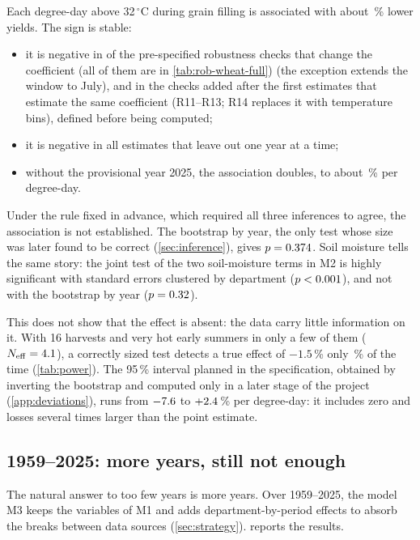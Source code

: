 Each degree-day above 32\,$^{\circ}$C during grain filling is associated with about \WheatPct\,\% lower yields. The sign is stable:
\begin{itemize}
  \item it is negative in \WheatRobPreNeg{} of the \WheatRobPreTot{} pre-specified robustness checks that change the coefficient (all of them are in \cref{tab:rob-wheat-full}) (the exception extends the window to July), and in the \WheatRobAddTot{} checks added after the first estimates that estimate the same coefficient (R11--R13; R14 replaces it with temperature bins), defined before being computed;
  \item it is negative in all \LoyoTot{} estimates that leave out one year at a time;
  \item without the provisional year 2025, the association doubles, to about \WheatNoTwentyFivePct\,\% per degree-day.
\end{itemize}

Under the rule fixed in advance, which required all three inferences to agree, the association is not established. The bootstrap by year, the only test whose size was later found to be correct (\cref{sec:inference}), gives $p = 0.374$. Soil moisture tells the same story: the joint test of the two soil-moisture terms in M2 is highly significant with standard errors clustered by department ($p <0.001$), and not with the bootstrap by year ($p = 0.32$).

This does not show that the effect is absent: the data carry little information on it. With 16 harvests and very hot early summers in only a few of them ($N_{\mathrm{eff}} = 4.1$), a correctly sized test detects a true effect of $-1.5$\,\% only \WheatPowerWCR\,\% of the time (\cref{tab:power}). The 95\,\% interval planned in the specification, obtained by inverting the bootstrap and computed only in a later stage of the project (\cref{app:deviations}), runs from $-7.6$ to $+2.4$\,\% per degree-day: it includes zero and losses several times larger than the point estimate.

\subsection{1959--2025: more years, still not enough}

The natural answer to too few years is more years. Over 1959--2025, the model M3 keeps the variables of M1 and adds department-by-period effects to absorb the breaks between data sources (\cref{sec:strategy}).  reports the results.


